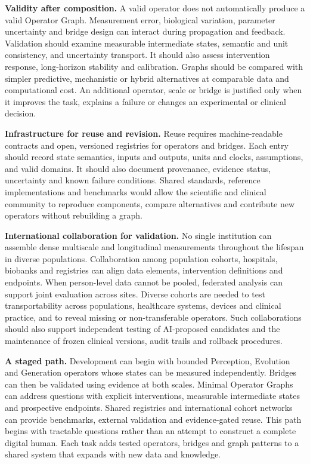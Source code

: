 \documentclass[12pt, letterpaper]{article} %
\begin{document}
\textbf{Validity after composition.} A valid operator does not automatically produce a valid Operator Graph. Measurement error, biological variation, parameter uncertainty and bridge design can interact during propagation and feedback. Validation should examine measurable intermediate states, semantic and unit consistency, and uncertainty transport. It should also assess intervention response, long-horizon stability and calibration. Graphs should be compared with simpler predictive, mechanistic or hybrid alternatives at comparable data and computational cost. An additional operator, scale or bridge is justified only when it improves the task, explains a failure or changes an experimental or clinical decision.

\textbf{Infrastructure for reuse and revision.} Reuse requires machine-readable contracts and open, versioned registries for operators and bridges. Each entry should record state semantics, inputs and outputs, units and clocks, assumptions, and valid domains. It should also document provenance, evidence status, uncertainty and known failure conditions. Shared standards, reference implementations and benchmarks would allow the scientific and clinical community to reproduce components, compare alternatives and contribute new operators without rebuilding a graph.

\textbf{International collaboration for validation.} No single institution can assemble dense multiscale and longitudinal measurements throughout the lifespan in diverse populations. Collaboration among population cohorts, hospitals, biobanks and registries can align data elements, intervention definitions and endpoints. When person-level data cannot be pooled, federated analysis can support joint evaluation across sites. Diverse cohorts are needed to test transportability across populations, healthcare systems, devices and clinical practice, and to reveal missing or non-transferable operators. Such collaborations should also support independent testing of AI-proposed candidates and the maintenance of frozen clinical versions, audit trails and rollback procedures.

\textbf{A staged path.} Development can begin with bounded Perception, Evolution and Generation operators whose states can be measured independently. Bridges can then be validated using evidence at both scales. Minimal Operator Graphs can address questions with explicit interventions, measurable intermediate states and prospective endpoints. Shared registries and international cohort networks can provide benchmarks, external validation and evidence-gated reuse. This path begins with tractable questions rather than an attempt to construct a complete digital human. Each task adds tested operators, bridges and graph patterns to a shared system that expands with new data and knowledge.



\end{document}
